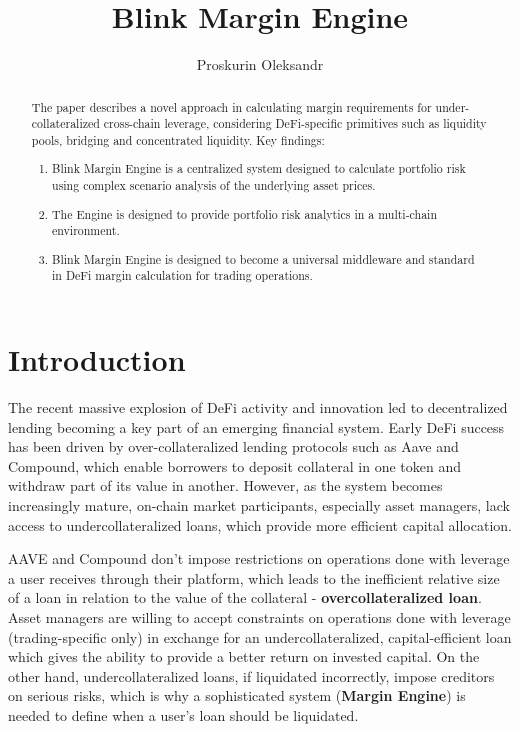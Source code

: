 \documentclass[letterpaper, 12pt]{article}
\begin{document}
 
\title{Blink Margin Engine}
\author{Proskurin Oleksandr}
\maketitle

\begin{abstract}
The paper describes a novel approach in calculating margin requirements for under-collateralized cross-chain leverage, considering DeFi-specific primitives such as liquidity pools, bridging and concentrated liquidity.
Key findings: 
\begin{enumerate}
  \item Blink Margin Engine is a centralized system designed to calculate portfolio risk using complex scenario analysis of the underlying asset prices.
  \item The Engine is designed to provide portfolio risk analytics in a multi-chain environment. 
  \item Blink Margin Engine is designed to become a universal middleware and standard in DeFi margin calculation for trading operations.
  \end{enumerate}
\end{abstract}


\section{Introduction}
The recent massive explosion of DeFi activity and innovation led to decentralized lending becoming a key part of an emerging financial system. Early DeFi success has been driven by over-collateralized lending protocols such as Aave and Compound, which enable borrowers to deposit collateral in one token and withdraw part of its value in another. However, as the system becomes increasingly mature, on-chain market participants, especially asset managers, lack access to undercollateralized loans, which provide more efficient capital allocation.

AAVE and Compound don't impose restrictions on operations done with leverage a user receives through their platform, which leads to the inefficient relative size of a loan in relation to the value of the collateral - \textbf {overcollateralized loan}. Asset managers are willing to accept constraints on operations done with leverage (trading-specific only) in exchange for an undercollateralized, capital-efficient loan which gives the ability to provide a better return on invested capital. On the other hand, undercollateralized loans, if liquidated incorrectly, impose creditors on serious risks, which is why a sophisticated system (\textbf {Margin Engine}) is needed to define when a user's loan should be liquidated. 
\end{document}
